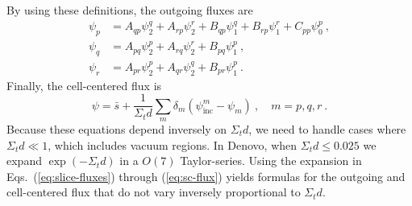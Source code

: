 \documentclass[12pt]{article}
\begin{document}
By using these definitions, the outgoing fluxes are
\begin{equation}
  \begin{aligned}
    \psi_p &= A_{qp}\psi_2^q + A_{rp}\psi_2^r + B_{qp}\psi_1^q +
    B_{rp}\psi_1^r + C_{pp}\psi_0^p\:,\\
    \psi_q &= A_{pq}\psi_2^p + A_{rq}\psi_2^r + B_{pq}\psi_1^p\:,\\
    \psi_r &= A_{pr}\psi_2^p + A_{qr}\psi_2^q + B_{pr}\psi_1^p\:.
  \end{aligned}
\end{equation}
Finally, the cell-centered flux is
\begin{equation}
  \psi = \bar{s} + \frac{1}{\Sigma_t
    d}\sum_{m}\delta_m(\psi_\text{inc}^m - \psi_m)\:,\quad m=p,q,r\:.
  \label{eq:sc-flux}
\end{equation}
Because these equations depend inversely on $\Sigma_t d$, we need to handle
cases where $\Sigma_t d \ll 1$, which includes vacuum regions.  In Denovo,
when $\Sigma_t d \le 0.025$ we expand $\exp(-\Sigma_t d)$ in a $O(7)$
Taylor-series.  Using the expansion in Eqs.~(\ref{eq:slice-fluxes}) through
(\ref{eq:sc-flux}) yields formulas for the outgoing and cell-centered flux
that do not vary inversely proportional to $\Sigma_t d$.
\end{document}
